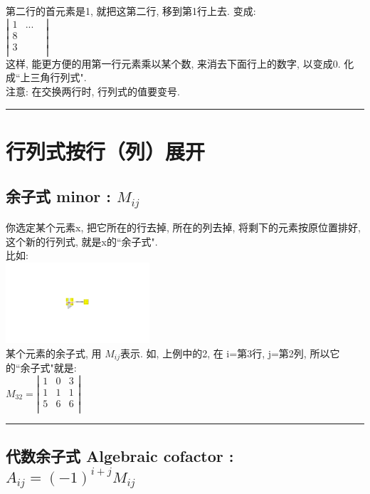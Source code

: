 \documentclass[UTF8]{ctexart}
\begin{document}
	第二行的首元素是1, 就把这第二行, 移到第1行上去. 变成: \\	
		$
	\left| \begin{matrix}
		1&		...&		\\
		8&		&		\\
		3&		&		\\
	\end{matrix} \right|
	$\\
	
	这样, 能更方便的用第一行元素乘以某个数, 来消去下面行上的数字, 以变成0. 化成``上三角行列式". \\
	注意: 在交换两行时, 行列式的值要变号. \\


\hrule

		
	\section{行列式按行（列）展开}
	
		\subsection{余子式 minor :  $M_{ij}$}
		
		你选定某个元素x, 把它所在的行去掉, 所在的列去掉, 将剩下的元素按原位置排好, 这个新的行列式, 就是x的``余子式". \\
		
		比如: \\
		\includegraphics[width=0.4\textwidth]{img/0012.pdf}\\
		
		某个元素的余子式, 用 $M_{ij}$表示. 如, 上例中的2, 在 i=第3行, j=第2列, 所以它的``余子式"就是: \\
		$
		M_{32}=\left| \begin{matrix}
			1&		0&		3\\
			1&		1&		1\\
			5&		6&		6\\
		\end{matrix} \right|
		$ \\
		

		\hrule

		
	\subsection{代数余子式 Algebraic cofactor : $	A_{ij}=\left( -1 \right) ^{i+j}M_{ij}$}
		
\end{document}
